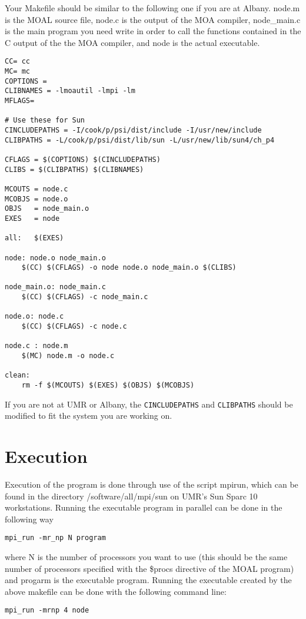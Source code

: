 \pagebreak
Your Makefile should be similar to the following one if you are at Albany.
node.m is the MOAL
source file, node.c is the output of the MOA compiler, node\_main.c is
the main program you need write in order to call the functions contained in
the C output of the the MOA compiler, and node is the actual executable.  
{\samepage
\begin{verbatim}
CC= cc
MC= mc
COPTIONS = 
CLIBNAMES = -lmoautil -lmpi -lm
MFLAGS=

# Use these for Sun
CINCLUDEPATHS = -I/cook/p/psi/dist/include -I/usr/new/include
CLIBPATHS = -L/cook/p/psi/dist/lib/sun -L/usr/new/lib/sun4/ch_p4

CFLAGS = $(COPTIONS) $(CINCLUDEPATHS)
CLIBS = $(CLIBPATHS) $(CLIBNAMES)

MCOUTS = node.c 
MCOBJS = node.o 
OBJS   = node_main.o 
EXES   = node

all:   $(EXES)

node: node.o node_main.o
	$(CC) $(CFLAGS) -o node node.o node_main.o $(CLIBS)

node_main.o: node_main.c
	$(CC) $(CFLAGS) -c node_main.c

node.o: node.c
	$(CC) $(CFLAGS) -c node.c

node.c : node.m
	$(MC) node.m -o node.c

clean:
	rm -f $(MCOUTS) $(EXES) $(OBJS) $(MCOBJS)
\end{verbatim}
}

If you are not at UMR or Albany, the {\tt CINCLUDEPATHS} and
{\tt CLIBPATHS} should be modified to fit the system you are working
on.

\section{Execution}
Execution of the program is done through use of the script mpirun, which can
be found in the directory /software/all/mpi/sun on UMR's Sun Sparc 10
workstations. Running the executable program in parallel can be done in the
following way
\begin{verbatim}
mpi_run -mr_np N program
\end{verbatim}
where N is the number of processors you want to use (this should be the
same number of processors specified with the \$procs directive of the MOAL
program) and progarm is the executable program.  Running the executable
created by the above makefile can be done with the following command line:
\begin{verbatim}
mpi_run -mrnp 4 node
\end{verbatim}

